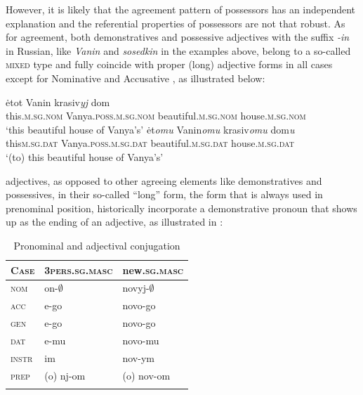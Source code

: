\documentclass[output=paper,colorlinks,citecolor=brown]{langscibook}
\begin{document}
However, it is likely that the agreement pattern of possessors has an independent explanation and the referential properties of possessors are not that robust. As for agreement, both demonstratives and possessive adjectives with the suffix \textit{-in} in Russian, like \textit{Vanin} and \textit{sosedkin} in the examples above, belong to a so-called \textsc{mixed} type and fully coincide with proper (long) adjective forms in all cases except for Nominative and Accusative \citep[][]{VojejkovaXologilova2022}, as illustrated below: 

\ea \label{vanincases}
\ea 	\label{vaninNOM} \gll 
\.{e}tot Vanin		krasiv\textit{yj} dom \\
this.\textsc{m.sg.nom} 	Vanya.\textsc{poss.m.sg.nom} 	beautiful.\textsc{m.sg.nom} house.\textsc{m.sg.nom}\\
\glt `this beautiful house of Vanya's'		
\ex \label{vaninDAT} \gll
\.{e}t\textit{omu} Vanin\textit{omu} krasiv\textit{omu} dom\textit{u}\\
this\textsc{m.sg.dat} 	Vanya.\textsc{poss.m.sg.dat} 	beautiful.\textsc{m.sg.dat} house.\textsc{m.sg.dat}\\
\glt `(to) this beautiful house of Vanya's'		
\z
\z 

\iffalse
adjectives, as opposed to other agreeing elements like demonstratives and possessives, in their so-called ``long'' form, the form that is always used in prenominal position, historically incorporate a demonstrative pronoun that shows up as the ending of an adjective, as illustrated in : 

\begin{table}[!ht]
\centering
\caption{Pronominal and adjectival conjugation}

\begin{tabularx}{.6\textwidth}{lXX}
\lsptoprule
\textsc{Case} & \textsc{3pers.sg.masc} &  new.\textsc{sg.masc}   \\\midrule

	\textsc{nom}	&		on-$\emptyset$ 	&	novyj-$\emptyset$\smallskip\\
	\textsc{acc}	&	e-go &	novo-go\smallskip\\
	\textsc{gen}  &	e-go	&	novo-go\smallskip\\
	\textsc{dat} & e-mu & novo-mu\smallskip\\
	\textsc{instr} & im & nov-ym\smallskip\\
	\textsc{prep} & (o) nj-om & (o) nov-om \\
 \lspbottomrule

\end{tabularx}
\label{borik:tab:1}
\end{table}
\end{document}
